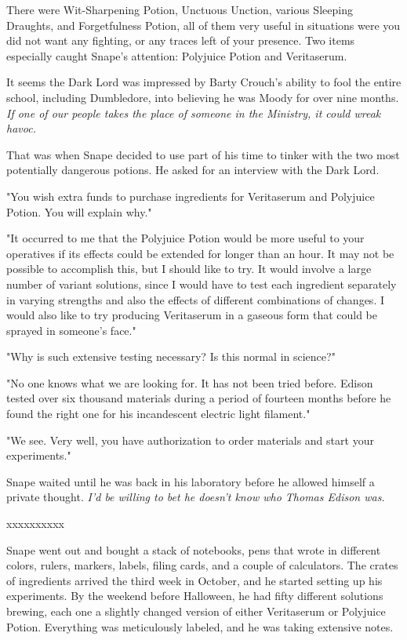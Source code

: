 \documentclass[a4paper,11pt]{article}
\begin{document}
There were Wit-Sharpening Potion, Unctuous Unction, various Sleeping Draughts, and Forgetfulness Potion, all of them very useful in situations were you did not want any fighting, or any traces left of your presence. Two items especially caught Snape's attention: Polyjuice Potion and Veritaserum.

It seems the Dark Lord was impressed by Barty Crouch's ability to fool the entire school, including Dumbledore, into believing he was Moody for over nine months. \emph{If one of our people takes the place of someone in the Ministry, it could wreak havoc.}

That was when Snape decided to use part of his time to tinker with the two most potentially dangerous potions. He asked for an interview with the Dark Lord.

"You wish extra funds to purchase ingredients for Veritaserum and Polyjuice Potion. You will explain why."

"It occurred to me that the Polyjuice Potion would be more useful to your operatives if its effects could be extended for longer than an hour. It may not be possible to accomplish this, but I should like to try. It would involve a large number of variant solutions, since I would have to test each ingredient separately in varying strengths and also the effects of different combinations of changes. I would also like to try producing Veritaserum in a gaseous form that could be sprayed in someone's face."

"Why is such extensive testing necessary? Is this normal in science?"

"No one knows what we are looking for. It has not been tried before. Edison tested over six thousand materials during a period of fourteen months before he found the right one for his incandescent electric light filament."

"We see. Very well, you have authorization to order materials and start your experiments."

Snape waited until he was back in his laboratory before he allowed himself a private thought. \emph{I'd be willing to bet he doesn't know who Thomas Edison was.}

xxxxxxxxxx

Snape went out and bought a stack of notebooks, pens that wrote in different colors, rulers, markers, labels, filing cards, and a couple of calculators. The crates of ingredients arrived the third week in October, and he started setting up his experiments. By the weekend before Halloween, he had fifty different solutions brewing, each one a slightly changed version of either Veritaserum or Polyjuice Potion. Everything was meticulously labeled, and he was taking extensive notes.
\end{document}
